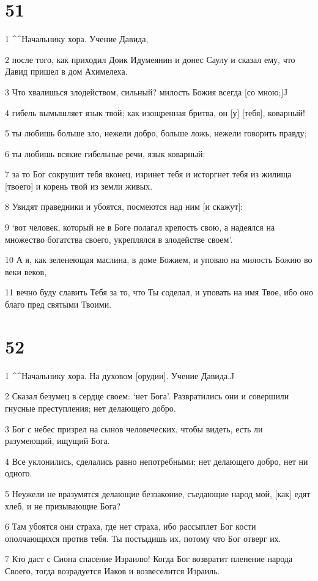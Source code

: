\chapter{51}

\par 1 ^^Начальнику хора. Учение Давида,
\par 2 после того, как приходил Доик Идумеянин и донес Саулу и сказал ему, что Давид пришел в дом Ахимелеха.
\par 3 Что хвалишься злодейством, сильный? милость Божия всегда [со мною;]^^
\par 4 гибель вымышляет язык твой; как изощренная бритва, он [у] [тебя], коварный!
\par 5 ты любишь больше зло, нежели добро, больше ложь, нежели говорить правду;
\par 6 ты любишь всякие гибельные речи, язык коварный:
\par 7 за то Бог сокрушит тебя вконец, изринет тебя и исторгнет тебя из жилища [твоего] и корень твой из земли живых.
\par 8 Увидят праведники и убоятся, посмеются над ним [и скажут]:
\par 9 `вот человек, который не в Боге полагал крепость свою, а надеялся на множество богатства своего, укреплялся в злодействе своем'.
\par 10 А я, как зеленеющая маслина, в доме Божием, и уповаю на милость Божию во веки веков,
\par 11 вечно буду славить Тебя за то, что Ты соделал, и уповать на имя Твое, ибо оно благо пред святыми Твоими.

\chapter{52}

\par 1 ^^Начальнику хора. На духовом [орудии]. Учение Давида.^^
\par 2 Сказал безумец в сердце своем: `нет Бога'. Развратились они и совершили гнусные преступления; нет делающего добро.
\par 3 Бог с небес призрел на сынов человеческих, чтобы видеть, есть ли разумеющий, ищущий Бога.
\par 4 Все уклонились, сделались равно непотребными; нет делающего добро, нет ни одного.
\par 5 Неужели не вразумятся делающие беззаконие, съедающие народ мой, [как] едят хлеб, и не призывающие Бога?
\par 6 Там убоятся они страха, где нет страха, ибо рассыплет Бог кости ополчающихся против тебя. Ты постыдишь их, потому что Бог отверг их.
\par 7 Кто даст с Сиона спасение Израилю! Когда Бог возвратит пленение народа Своего, тогда возрадуется Иаков и возвеселится Израиль.

